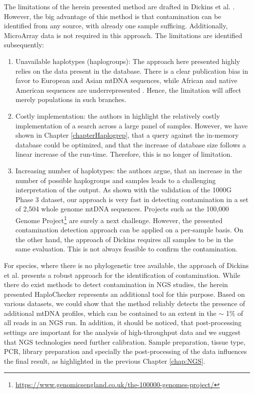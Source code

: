 The limitations of the herein presented method are drafted in Dickins et al. \cite{Dickins2014}. However, the big advantage of this method is that contamination can be identified from any source, with already one sample sufficing. Additionally, MicroArray data is not required in this approach. The limitations are identified subsequently:
\begin{enumerate}
\item Unavailable haplotypes (haplogroups): The approach here presented highly relies on the data present in the database. There is a clear publication bias in favor to European and Asian mtDNA sequences, while African and native American sequences are underrepresented \cite{Fendt2011}. Hence, the limitation will affect merely populations in such branches. 
\item Costly implementation: the authors in \cite{Dickins2014} highlight the relatively costly implementation of a search across a large panel of samples. However, we have shown in Chapter \ref{chapterHaplogrep}, that a query against the in-memory database could be optimized, and that the increase of database size follows a linear increase of the run-time. Therefore, this is no longer of limitation.
\item Increasing number of haplotypes: the authors argue, that an increase in the number of possible haplogroups and samples leads to a challenging interpretation of the output. As shown with the validation of the 1000G Phase 3 dataset, our approach is very fast in detecting contamination in a set of 2,504 whole genome mtDNA sequences. Projects such as the 100,000 Genome Project\footnote{\url{https://www.genomicsengland.co.uk/the-100000-genomes-project/}} are surely a next challenge. However, the presented  contamination detection approach can be applied on a per-sample basis. On the other hand, the approach of Dickins requires all samples to be in the same evaluation. This is not always feasible to confirm the contamination.
\end{enumerate}
For species, where there is no phylogenetic tree available, the approach of Dickins et al. presents a robust approach for the identification of contamination. While there do exist methods to detect contamination in NGS studies, the herein presented HaploChecker represents an additional tool for this purpose. Based on various datasets, we could show that the method reliably detects the presence of additional mtDNA profiles, which can be contained to an extent in the $\sim$ 1\% of all reads in an NGS run. 
In addition, it should be noticed, that post-processing settings are important for the analysis of high-throughput data and we suggest that NGS technologies need further calibration. Sample preparation, tissue type, PCR, library preparation and specially the post-processing of the data influences the final result, as highlighted in the previous Chapter \ref{chap:NGS}.


